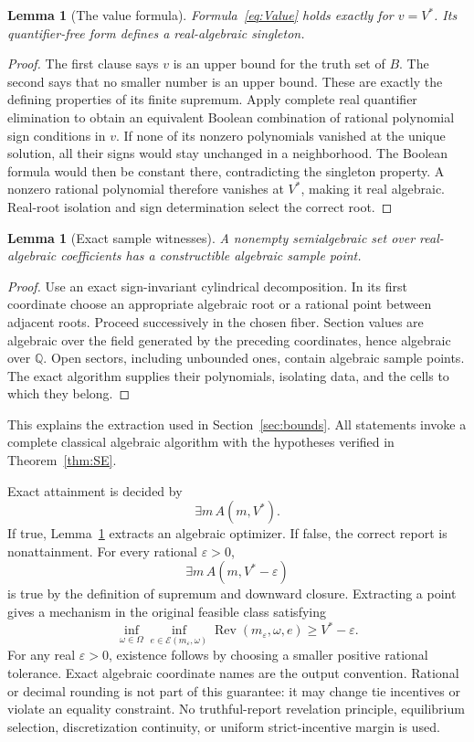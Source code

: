 \documentclass[11pt,a4paper]{article}
\numberwithin{equation}{section}
\newtheorem{lemma}[theorem]{Lemma}
\theoremstyle{definition}
\newcommand{\Q}{\mathbb Q}
\newcommand{\cE}{\mathcal E}
\DeclareMathOperator{\Rev}{Rev}
\begin{document}
\begin{lemma}[The value formula]\label{lem:value}
Formula~\eqref{eq:Value} holds exactly for \(v=V^*\).
Its quantifier-free form defines a real-algebraic singleton.
\end{lemma}
\begin{proof}
The first clause says \(v\) is an upper bound for the truth set of
\(B\). The second says that no smaller number is an upper bound.
These are exactly the defining properties of its finite supremum.
Apply complete real quantifier elimination to obtain an equivalent
Boolean combination of rational polynomial sign conditions in \(v\).
If none of its nonzero polynomials vanished at the unique solution,
all their signs would stay unchanged in a neighborhood.
The Boolean formula would then be constant there, contradicting
the singleton property. A nonzero rational polynomial therefore
vanishes at \(V^*\), making it real algebraic.
Real-root isolation and sign determination select the correct root.
\end{proof}

\begin{lemma}[Exact sample witnesses]\label{lem:sample}
A nonempty semialgebraic set over real-algebraic coefficients has a
constructible algebraic sample point.
\end{lemma}
\begin{proof}
Use an exact sign-invariant cylindrical decomposition.
In its first coordinate choose an appropriate algebraic root or
a rational point between adjacent roots.
Proceed successively in the chosen fiber.
Section values are algebraic over the field generated by the
preceding coordinates, hence algebraic over \(\Q\).
Open sectors, including unbounded ones, contain algebraic sample
points. The exact algorithm supplies their polynomials, isolating
data, and the cells to which they belong.
\end{proof}
This explains the extraction used in Section~\ref{sec:bounds}.
All statements invoke a complete classical algebraic algorithm with
the hypotheses verified in Theorem~\ref{thm:SE}.

Exact attainment is decided by
\begin{equation}\label{eq:attainment}
 \exists m\,A(m,V^*).
\end{equation}
If true, Lemma~\ref{lem:sample} extracts an algebraic optimizer.
If false, the correct report is nonattainment.
For every rational \(\varepsilon>0\),
\begin{equation}\label{eq:epsilon}
 \exists m\,A(m,V^*-\varepsilon)
\end{equation}
is true by the definition of supremum and downward closure.
Extracting a point gives a mechanism in the original feasible
class satisfying
\[
 \inf_{\omega\in\Omega}\inf_{e\in\cE(m_\varepsilon,\omega)}
       \Rev(m_\varepsilon,\omega,e)\ge V^*-\varepsilon.
\]
For any real \(\varepsilon>0\), existence follows by choosing a
smaller positive rational tolerance.
Exact algebraic coordinate names are the output convention.
Rational or decimal rounding is not part of this guarantee:
it may change tie incentives or violate an equality constraint.
No truthful-report revelation principle, equilibrium selection,
discretization continuity, or uniform strict-incentive margin is used.
\end{document}
